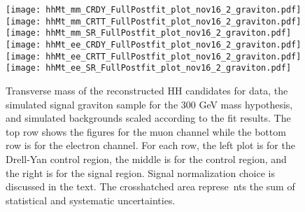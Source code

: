 \begin{figure}[tbp]
  \begin{center}
    \texttt{[image: hhMt\_mm\_CRDY\_FullPostfit\_plot\_nov16\_2\_graviton.pdf]}
    \texttt{[image: hhMt\_mm\_CRTT\_FullPostfit\_plot\_nov16\_2\_graviton.pdf]}
    \texttt{[image: hhMt\_mm\_SR\_FullPostfit\_plot\_nov16\_2\_graviton.pdf]} \\
    \texttt{[image: hhMt\_ee\_CRDY\_FullPostfit\_plot\_nov16\_2\_graviton.pdf]}
    \texttt{[image: hhMt\_ee\_CRTT\_FullPostfit\_plot\_nov16\_2\_graviton.pdf]}
    \texttt{[image: hhMt\_ee\_SR\_FullPostfit\_plot\_nov16\_2\_graviton.pdf]}
    \caption{Transverse mass of the reconstructed HH candidates for data, the simulated signal graviton sample
    for the 300 GeV mass hypothesis, and simulated backgrounds scaled according to the fit results. The top
    row shows the figures for the muon channel while the bottom row is for the electron channel. For each row,
    the left plot is for the Drell-Yan control region, the middle is for the \ttbar control region, and the right
    is for the signal region. Signal normalization choice is discussed in the text. The crosshatched area represe\
nts
    the sum of statistical and systematic uncertainties.}
    \label{fig:MCcomparisons}
%                                                                                                                 
  \end{center}
\end{figure}




